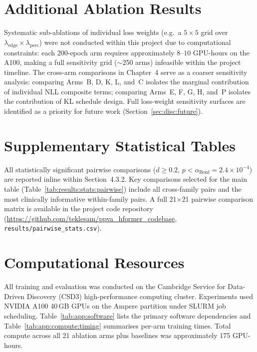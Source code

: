\documentclass[12pt, a4paper, twoside, openright]{book}
\begin{document}
\begin{appendices}
\chapter{Additional Ablation Results}
\label{app:ablations}

Systematic sub-ablations of individual loss weights (e.g.\ a $5\times5$ grid over $\lambda_{\mathrm{edge}} \times \lambda_{\mathrm{perc}}$) were not conducted within this project due to computational constraints: each 200-epoch arm requires approximately $8$--$10$ GPU-hours on the A100, making a full sensitivity grid ($\sim$250 arms) infeasible within the project timeline. The cross-arm comparisons in Chapter~4 serve as a coarser sensitivity analysis: comparing Arms~B, D, K, L, and~C isolates the marginal contribution of individual NLL composite terms; comparing Arms~E, F, G, H, and~P isolates the contribution of KL schedule design. Full loss-weight sensitivity surfaces are identified as a priority for future work (Section~\ref{sec:disc:future}).

\chapter{Supplementary Statistical Tables}
\label{app:suptables}

All statistically significant pairwise comparisons ($d \geq 0.2$, $p < \alpha_{\mathrm{Bonf}} = 2.4 \times 10^{-4}$) are reported inline within Section~4.3.2. Key comparisons selected for the main table (Table~\ref{tab:results:stats:pairwise}) include all cross-family pairs and the most clinically informative within-family pairs. A full 21$\times$21 pairwise comparison matrix is available in the project code repository (\url{https://github.com/teklesam/ppva_hformer_codebase}, \texttt{results/pairwise\_stats.csv}).

\chapter{Computational Resources}
\label{app:compute}

All training and evaluation was conducted on the Cambridge Service for Data-Driven Discovery (CSD3) high-performance computing cluster. Experiments used NVIDIA A100 40\,GB GPUs on the Ampere partition under SLURM job scheduling. Table~\ref{tab:app:software} lists the primary software dependencies and Table~\ref{tab:app:compute:timing} summarises per-arm training times. Total compute across all 21 ablation arms plus baselines was approximately 175 GPU-hours.


\end{appendices}
\end{document}
